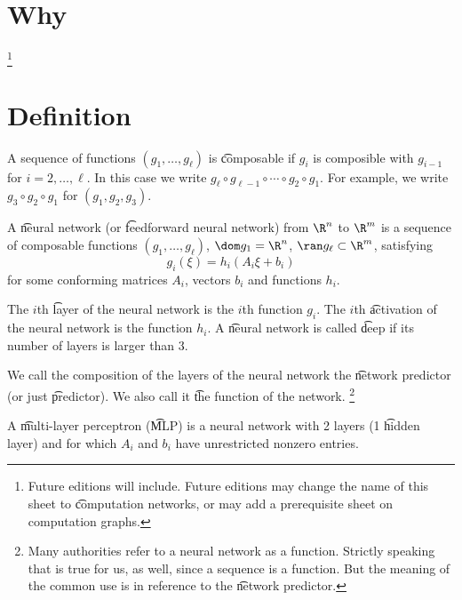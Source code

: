 
\section*{Why}

\ifhmode\unskip\fi\footnote{
Future editions will include. Future editions may change the name of this sheet to \t{computation networks}, or may add a prerequisite sheet on computation graphs.
}
\section*{Definition}

A sequence of functions $(g_1, \dots , g_\ell )$ is \t{composable} if $g_i$ is composible with $g_{i-1}$ for $i = 2, \dots , \ell $.
In this case we write $g_\ell  \circ g_{\ell -1} \circ \cdots \circ g_2 \circ g_1$. For example, we write $g_3 \circ g_2 \circ g_1$ for $(g_1, g_2, g_3)$.

A \t{neural network} (or \t{feedforward neural network}) from $\R ^n$ to $\R ^m$ is a sequence of composable functions $(g_1, \dots , g_{\ell })$, $\dom g_1 = \R ^n$, $\ran g_\ell  \subset \R ^m$, satisfying
    \[
g_i(\xi ) = h_i(A_i \xi  + b_i)
    \]
for some conforming matrices $A_i$, vectors $b_i$ and functions $h_i$.

The $i$th \t{layer} of the neural network is the $i$th function $g_i$.
The $i$th \t{activation} of the neural network is the function $h_i$.
A \t{neural network} is called \t{deep} if its number of layers is larger than 3.

We call the composition of the layers of the neural network the \t{network predictor} (or just \t{predictor}).
We also call it \t{the function} of the network.
    \ifhmode\unskip\fi\footnote{
Many authorities refer to a neural network as a function. Strictly speaking that is true for us, as well, since a sequence is a function. But the meaning of the common use is in reference to the \t{network predictor}.
    }

A \t{multi-layer perceptron} (\t{MLP}) is a neural network with 2 layers (1 \t{hidden layer}) and for which $A_i$ and $b_i$ have unrestricted nonzero entries.



\blankpage